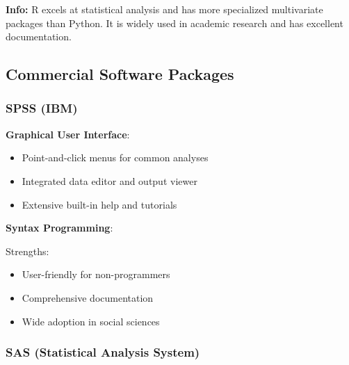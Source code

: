 \documentclass[
]{article}
\begin{document}
\textbf{Info: } R excels at statistical analysis and has more
specialized multivariate packages than Python. It is widely used in
academic research and has excellent documentation.

\textbf{ }

\subsection{Commercial Software Packages}

\subsubsection{SPSS (IBM)}

\textbf{Graphical User Interface}:

\begin{itemize}
\item
  Point-and-click menus for common analyses
\item
  Integrated data editor and output viewer
\item
  Extensive built-in help and tutorials
\end{itemize}

\textbf{Syntax Programming}:

\begin{Shaded}
\begin{Highlighting}[]


\end{Highlighting}
\end{Shaded}

Strengths:

\begin{itemize}
\item
  User-friendly for non-programmers
\item
  Comprehensive documentation
\item
  Wide adoption in social sciences
\end{itemize}

\subsubsection{SAS (Statistical Analysis System)}
\end{document}
